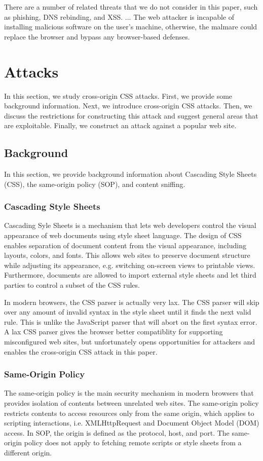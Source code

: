 \documentclass{acm_proc_article-sp}
\begin{document}
There are a number of related threats that we do not consider in this paper, such as phishing, DNS rebinding, and XSS.
...
The web attacker is incapable of installing malicious software on the user's machine, otherwise, the malmare could replace the browser and bypass any browser-based defenses.

\section{Attacks}
In this section, we study cross-origin CSS attacks. First, we provide some background information. Next, we introduce cross-origin CSS attacks. Then, we discuss the restrictions for constructing this attack and suggest general areas that are exploitable. Finally, we construct an attack against a popular web site.

\subsection{Background}
In this section, we provide background information about Cascading Style Sheets (CSS), the same-origin policy (SOP), and content sniffing.

\subsubsection{Cascading Style Sheets}
Cascading Syle Sheets\cite{css} is a mechanism that lets web developers control the visual appearance of web documents using style sheet language. The design of CSS enables separation of document content from the visual appearance, including layouts, colors, and fonts. This allows web sites to preserve document structure while adjusting its appearance, e.g. switching on-screen views to printable views. Furthermore, documents are allowed to import external style sheets and let third parties to control a subset of the CSS rules.

In modern browsers, the CSS parser is actually very lax. The CSS parser will skip over any amount of invalid syntax in the style sheet until it finds the next valid rule. This is unlike the JavaScript parser that will abort on the first syntax error. A lax CSS parser gives the browser better compatiblity for supporting misconfigured web sites, but unfortunately opens opportunities for attackers and enables the cross-origin CSS attack in this paper.

\subsubsection{Same-Origin Policy}
The same-origin policy\cite{mozillasameorigin} is the main security mechanism in modern browsers that provides isolation of contents between unrelated web sites. The same-origin policy restricts contents to access resources only from the same origin, which applies to scripting interactions, i.e. XMLHttpRequest and Document Object Model (DOM)\cite{dom} access. In SOP, the origin is defined as the protocol, host, and port. The same-origin policy does not apply to fetching remote scripts or style sheets from a different origin.
\end{document}
